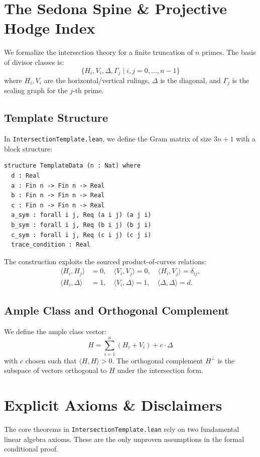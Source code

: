 \documentclass[11pt]{nyjm}
\theoremstyle{definition}
\begin{document}
\section{The Sedona Spine \& Projective Hodge Index}
We formalize the intersection theory for a finite truncation of $n$ primes. The basis of divisor classes is:
\[
\{H_i, V_i, \Delta, \Gamma_j \mid i, j = 0, \dots, n-1\}
\]
where $H_i, V_i$ are the horizontal/vertical rulings, $\Delta$ is the diagonal, and $\Gamma_j$ is the scaling graph for the $j$-th prime.

\subsection{Template Structure}
In \texttt{IntersectionTemplate.lean}, we define the Gram matrix of size $3n+1$ with a block structure:

\begin{lstlisting}[caption={Template Data Structure}]
structure TemplateData (n : Nat) where
  d : Real
  a : Fin n -> Fin n -> Real
  b : Fin n -> Fin n -> Real
  c : Fin n -> Fin n -> Real
  a_sym : forall i j, Req (a i j) (a j i)
  b_sym : forall i j, Req (b i j) (b j i)
  c_sym : forall i j, Req (c i j) (c j i)
  trace_condition : Real
\end{lstlisting}

The construction exploits the sourced product-of-curves relations:
\begin{align*}
\langle H_i, H_j \rangle &= 0, \quad \langle V_i, V_j \rangle = 0, \quad \langle H_i, V_j \rangle = \delta_{ij}, \\
\langle H_i, \Delta \rangle &= 1, \quad \langle V_i, \Delta \rangle = 1, \quad \langle \Delta, \Delta \rangle = d.
\end{align*}

\subsection{Ample Class and Orthogonal Complement}
We define the ample class vector:
\[
H = \sum_{i=1}^n (H_i + V_i) + c \cdot \Delta
\]
with $c$ chosen such that $\langle H, H \rangle > 0$. The orthogonal complement $H^\perp$ is the subspace of vectors orthogonal to $H$ under the intersection form.

\section{Explicit Axioms \& Disclaimers}
The core theorems in \texttt{IntersectionTemplate.lean} rely on two fundamental linear algebra axioms. These are the only unproven assumptions in the formal conditional proof.
\end{document}
